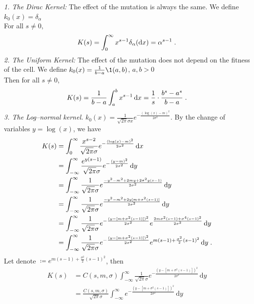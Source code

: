 \documentclass[11pt]{amsart}
\newcommand{\diff}{\,\mathrm{d}}
\newcommand{\dd}{\mathrm{d}}
\begin{document}
\textit{1. The Dirac Kernel:} The effect of the mutation is always the same. We define $k_0(x) = \delta_\alpha$ \\
For all $s \neq 0$, 
\begin{align*}
    K(s) = \int_0^\infty x^{s-1} \delta_\alpha(\dd x) = \alpha^{s-1}
    \eqfinp
\end{align*}
\textit{2. The Uniform Kernel:} The effect of the mutation does not depend on the fitness of the cell. We define $k_0(x) = \frac{1}{b-a}\1{(a,b)}$, $a,b > 0$ \\
Then for all $s \neq 0$, 
    \begin{align*}
        K(s) = \frac{1}{b-a}\int_a^b x^{s-1}\diff x = \frac1s \cdot\frac{b^s - a^s}{b-a}
        \eqfinp
    \end{align*}
\textit{3. The Log--normal kernel.} $k_0(x) = \frac{1}{\sqrt{2\pi}\sigma x} e^{-\frac{(\log(x)-m)^2}{2\sigma^2}}$.
By the change of variables $y = \log(x)$, we have
    \begin{align*}
        K(s) 
        &= \int_0^\infty \frac{x^{s-2}}{\sqrt{2\pi}\sigma} e^{-\frac{(\log(x)-m)^2}{2\sigma^2}} \diff x \\
        &= \int_{-\infty}^\infty \frac{e^{y(s-1)}}{\sqrt{2\pi}\sigma} e^{-\frac{(y-m)^2}{2\sigma^2}} \diff y \\
        &=  \int_{-\infty}^\infty \frac{1}{\sqrt{2\pi}\sigma} e^{\frac{-y^2 - m^2 + 2m y + 2\sigma^2 y(s-1)}{2\sigma^2}} \diff y \\
        &=  \int_{-\infty}^\infty \frac{1}{\sqrt{2\pi}\sigma} e^{\frac{-y^2 - m^2 + 2y[m + \sigma^2 (s-1)]}{2\sigma^2}} \diff y \\
        &=  \int_{-\infty}^\infty \frac{1}{\sqrt{2\pi}\sigma} 
        e^{-\frac{(y - [m + \sigma^2 (s-1)])^2}{2\sigma^2}}
        e^{\frac{2m \sigma^2(s-1)+\sigma^4(s-1)^2}{2\sigma^2}}\diff y \\
        &=  \int_{-\infty}^\infty \frac{1}{\sqrt{2\pi}\sigma} 
        e^{-\frac{(y - [m + \sigma^2 (s-1)])^2}{2\sigma^2}}
        e^{m (s-1)+\frac{\sigma^2}{2}(s-1)^2}\diff y
        \eqfinp
    \end{align*}
Let denote $  \coloneqq e^{m (s-1)+\frac{\sigma^2}{2}(s-1)^2}$, then 
\begin{align*}
    K(s) 
    &=  C(s,m,\sigma) \int_{-\infty}^\infty \frac{1}{\sqrt{2\pi}\sigma} 
        e^{-\frac{(y - [m + \sigma^2 (s-1)])^2}{2\sigma^2}}\diff y
        \\
        &=  \frac{C(s,m,\sigma)}{\sqrt{2\pi}\sigma} \int_{-\infty}^\infty
        e^{-\frac{(y - [m + \sigma^2 (s-1)])^2}{2\sigma^2}}\diff y
\end{align*}
\end{document}
